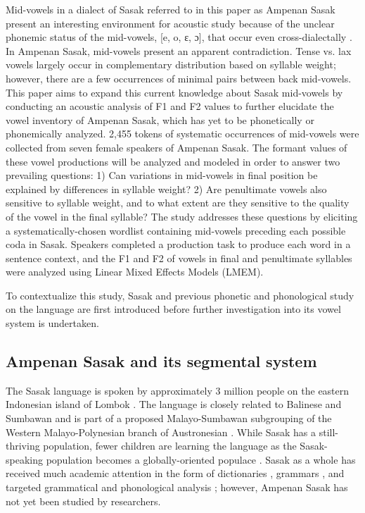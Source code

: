 \documentclass[12pt]{ouparticle}
\begin{document}
Mid-vowels in a dialect of Sasak referred to in this paper as Ampenan Sasak present an interesting environment for acoustic study because of the unclear phonemic status of the mid-vowels, [e, o, ɛ, ɔ], that occur even cross-dialectally \citep{chahal1998, jacq1998, archangeli2018}. In Ampenan Sasak, mid-vowels present an apparent contradiction. Tense vs. lax vowels largely occur in complementary distribution based on syllable weight; however, there are a few occurrences of minimal pairs between back mid-vowels. This paper aims to expand this current knowledge about Sasak mid-vowels by conducting an acoustic analysis of F1 and F2 values to further elucidate the vowel inventory of Ampenan Sasak, which has yet to be phonetically or phonemically analyzed. 2,455 tokens of systematic occurrences of mid-vowels were collected from seven female speakers of Ampenan Sasak. The formant values of these vowel productions will be analyzed and modeled in order to answer two prevailing questions: 1) Can variations in mid-vowels in final position be explained by differences in syllable weight? 2) Are penultimate vowels also sensitive to syllable weight, and to what extent are they sensitive to the quality of the vowel in the final syllable? The study addresses these questions by eliciting a systematically-chosen wordlist containing mid-vowels preceding each possible coda in Sasak. Speakers completed a production task to produce each word in a sentence context, and the F1 and F2 of vowels in final and penultimate syllables were analyzed using Linear Mixed Effects Models (LMEM).

To contextualize this study, Sasak and previous phonetic and phonological study on the language are first introduced before further investigation into its vowel system is undertaken.


\subsection{Ampenan Sasak and its segmental system}\label{sec:segment}

The Sasak language is spoken by approximately 3 million people on the eastern Indonesian island of Lombok \citep{eberhard2019}. The language is closely related to Balinese and Sumbawan and is part of a proposed Malayo-Sumbawan subgrouping of the Western Malayo-Polynesian branch of Austronesian \citep{adelaar2005}. While Sasak has a still-thriving population, fewer children are learning the language as the Sasak-speaking population becomes a globally-oriented populace \citep{djenar2018}. Sasak as a whole has received much academic attention in the form of dictionaries \citep{thoir1985, staff1995}, grammars \citep{thoir1985/6}, and targeted grammatical and phonological analysis \citep[e.g.][]{austin2010, archangeli2017}; however, Ampenan Sasak has not yet been studied by researchers.
\end{document}
